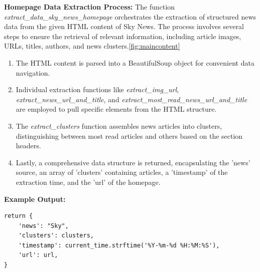 \documentclass[10pt]{article}
\begin{document}
\textbf{Homepage Data Extraction Process:}
The function \textit{extract\_data\_sky\_news\_homepage} orchestrates the extraction of structured news data from the given HTML content of Sky News. The process involves several steps to ensure the retrieval of relevant information, including article images, URLs, titles, authors, and news clusters.\ref{fig:maincontent}

\begin{enumerate}
    \item The HTML content is parsed into a BeautifulSoup object for convenient data navigation.
    \item Individual extraction functions like \textit{extract\_img\_url}, \textit{extract\_news\_url\_and\_title}, and \textit{extract\_most\_read\_news\_url\_and\_title} are employed to pull specific elements from the HTML structure.
    \item The \textit{extract\_clusters} function assembles news articles into clusters, distinguishing between most read articles and others based on the section headers.
    \item Lastly, a comprehensive data structure is returned, encapsulating the 'news' source, an array of 'clusters' containing articles, a 'timestamp' of the extraction time, and the 'url' of the homepage.
\end{enumerate}
\textbf{Example Output:}
\begin{lstlisting}
return {
    'news': "Sky",
    'clusters': clusters,
    'timestamp': current_time.strftime('%Y-%m-%d %H:%M:%S'),
    'url': url,
}
\end{lstlisting}
\end{document}
